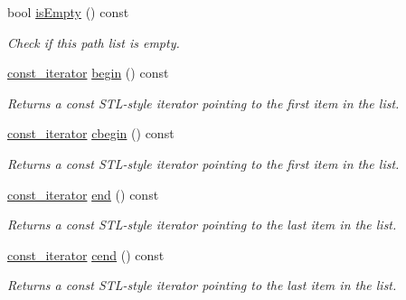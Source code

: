 \begin{DoxyCompactItemize}
bool \hyperlink{class_mdt_1_1_deploy_utils_1_1_path_list_ae2b68179e5536ee2bc063b133f88bb4a}{is\+Empty} () const 
\begin{DoxyCompactList}\small\item\em Check if this path list is empty. \end{DoxyCompactList}\item 
\hyperlink{class_mdt_1_1_deploy_utils_1_1_path_list_a2666c4c9348c4f7a28014d4de9599717}{const\+\_\+iterator} \hyperlink{class_mdt_1_1_deploy_utils_1_1_path_list_a13c645c41b4492ab0d10b887cb77e739}{begin} () const 
\begin{DoxyCompactList}\small\item\em Returns a const S\+T\+L-\/style iterator pointing to the first item in the list. \end{DoxyCompactList}\item 
\hyperlink{class_mdt_1_1_deploy_utils_1_1_path_list_a2666c4c9348c4f7a28014d4de9599717}{const\+\_\+iterator} \hyperlink{class_mdt_1_1_deploy_utils_1_1_path_list_a980da2988f38bf64bf76f6b61b572582}{cbegin} () const 
\begin{DoxyCompactList}\small\item\em Returns a const S\+T\+L-\/style iterator pointing to the first item in the list. \end{DoxyCompactList}\item 
\hyperlink{class_mdt_1_1_deploy_utils_1_1_path_list_a2666c4c9348c4f7a28014d4de9599717}{const\+\_\+iterator} \hyperlink{class_mdt_1_1_deploy_utils_1_1_path_list_ab65fbf7392d22bf249583ff1aefd3f78}{end} () const 
\begin{DoxyCompactList}\small\item\em Returns a const S\+T\+L-\/style iterator pointing to the last item in the list. \end{DoxyCompactList}\item 
\hyperlink{class_mdt_1_1_deploy_utils_1_1_path_list_a2666c4c9348c4f7a28014d4de9599717}{const\+\_\+iterator} \hyperlink{class_mdt_1_1_deploy_utils_1_1_path_list_a0a36320111aac2c79060dbe778286f54}{cend} () const 
\begin{DoxyCompactList}\small\item\em Returns a const S\+T\+L-\/style iterator pointing to the last item in the list. \end{DoxyCompactList}\end{DoxyCompactItemize}
